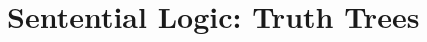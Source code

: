 \documentclass[../logic-text.tex]{subfiles}
\begin{document}
\chapter{Sentential Logic: Truth Trees}
\label{"waiting for reftex-label call..."}
\end{document}
